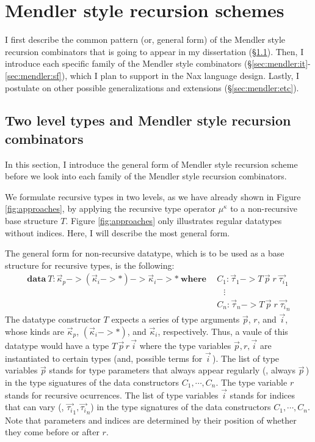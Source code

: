 \section{Mendler style recursion schemes}\label{sec:Mendler}
I first describe the common pattern (or, general form) of the Mendler style
recursion combinators that is going to appear in my dissertation
(\S\ref{sec:mendler:intro}). Then, I introduce each specific family of
the Mendler style combinators (\S\ref{sec:mendler:it}-\ref{sec:mendler:sf}),
which I plan to support in the Nax language design. Lastly, I postulate on
other possible generalizations and extensions (\S\ref{sec:mendler:etc}).

\subsection{Two level types and Mendler style recursion combinators}
\label{sec:mendler:intro}
In this section, I introduce the general form of Mendler style recursion scheme
before we look into each family of the Mendler style recursion combinators.

We formulate recursive types in two levels, as we have already shown
in Figure \ref{fig:approaches}, by applying the recursive type operator
$\mu^\kappa$ to a non-recursive base structure $T$. Figure \ref{fig:approaches}
only illustrates regular datatypes without indices. Here, I will describe
the most general form.

The general form for non-recursive datatype, which is to be used
as a base structure for recursive types, is the following:
\begin{align*}
\textbf{data}~ T : \vec{\kappa}_p -> (\vec{\kappa}_i -> *) ->
                                      \vec{\kappa}_i -> *
~\textbf{where}~
&~ C_1 : \vec{\tau}_1 -> T\,\vec{p}\;r\;\vec{\tau_i}_{1} \\
&\quad \vdots \\
&~ C_n : \vec{\tau}_n -> T\,\vec{p}\;r\;\vec{\tau_i}_{n}
\end{align*}
The datatype constructor $T$ expects a series of type arguments $\vec{p}$, $r$,
and $\vec{i}$, whose kinds are $\vec{\kappa}_p$, $(\vec{\kappa}_i -> *)$, and
$\vec{\kappa}_i$, respectively. Thus, a vaule of this datatype would have
a type $T\,\vec{p}\,r\,\vec{i}$ where the type variables $\vec{p},r,\vec{i}$
are instantiated to certain types (and, possible terms for $\vec{i}$\,).
The list of type variables $\vec{p}$ stands for type parameters that
always appear regularly (\ie, always $\vec{p}$\,) in the type siguatures of
the data constructors $C_1,\cdots,C_n$. The type variable $r$ stands for
recursive ocurrences. The list of type variables $\vec{i}$ stands for indices
that can vary (\eg, $\vec{\tau_i}_1,\vec{\tau_i}_n$) in the type signatures of
the data constructors $C_1,\cdots,C_n$. Note that parameters and indices are
determined by their position of whether they come before or after $r$.

